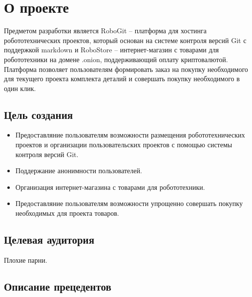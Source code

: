 \documentclass[12pt, a4paper]{article}
\begin{document}
% 



\section{О проекте}

Предметом разработки является RoboGit -- платформа для хостинга робототехнических проектов,
который основан на системе контроля версий Git с поддержкой markdown и
RoboStore -- интернет-магазин с товарами для робототехники на домене .onion,
поддерживающий оплату криптовалютой.
Платформа позволяет пользователям формировать заказ на покупку необходимого для
текущего проекта комплекта деталий и совершать покупку необходимого в один клик.

\subsection{Цель создания}

\begin{itemize}
  \item{Предоставляние пользователям возможности размещения робототехнических
    проектов и организации пользовательских проектов
    с помощью системы контроля версий Git.}
  \item{Поддержание анонимности пользователей.}
  \item{Организация интернет-магазина с товарами для робототехники.}
  \item{Предоставляние пользователям возможности упрощенно совершать покупку
    необходимых для проекта товаров.}
\end {itemize}

\subsection{Целевая аудитория}

Плохие парни.

\subsection{Описание прецедентов}
\end{document}
